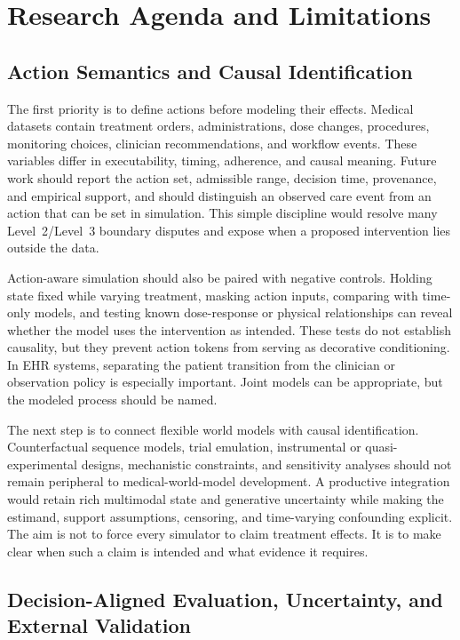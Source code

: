 \section{Research Agenda and Limitations}
\label{sec:agenda}

\subsection{Action Semantics and Causal Identification}

The first priority is to define actions before modeling their effects. Medical datasets contain treatment orders, administrations, dose changes, procedures, monitoring choices, clinician recommendations, and workflow events. These variables differ in executability, timing, adherence, and causal meaning. Future work should report the action set, admissible range, decision time, provenance, and empirical support, and should distinguish an observed care event from an action that can be set in simulation. This simple discipline would resolve many Level~2/Level~3 boundary disputes and expose when a proposed intervention lies outside the data.

Action-aware simulation should also be paired with negative controls. Holding state fixed while varying treatment, masking action inputs, comparing with time-only models, and testing known dose-response or physical relationships can reveal whether the model uses the intervention as intended. These tests do not establish causality, but they prevent action tokens from serving as decorative conditioning. In EHR systems, separating the patient transition from the clinician or observation policy is especially important. Joint models can be appropriate, but the modeled process should be named.

The next step is to connect flexible world models with causal identification. Counterfactual sequence models, trial emulation, instrumental or quasi-experimental designs, mechanistic constraints, and sensitivity analyses should not remain peripheral to medical-world-model development. A productive integration would retain rich multimodal state and generative uncertainty while making the estimand, support assumptions, censoring, and time-varying confounding explicit. The aim is not to force every simulator to claim treatment effects. It is to make clear when such a claim is intended and what evidence it requires.

\subsection{Decision-Aligned Evaluation, Uncertainty, and External Validation}

